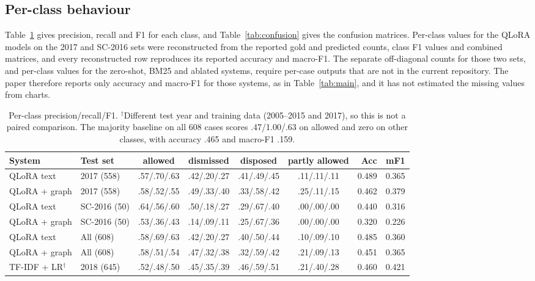 \documentclass[journal]{IEEEtran}
\begin{document}
\subsection{Per-class behaviour}
Table~\ref{tab:perclass} gives precision, recall and F1 for each class, and Table~\ref{tab:confusion} gives the confusion matrices. Per-class values for the QLoRA models on the 2017 and SC-2016 sets were reconstructed from the reported gold and predicted counts, class F1 values and combined matrices, and every reconstructed row reproduces its reported accuracy and macro-F1. The separate off-diagonal counts for those two sets, and per-class values for the zero-shot, BM25 and ablated systems, require per-case outputs that are not in the current repository. The paper therefore reports only accuracy and macro-F1 for those systems, as in Table~\ref{tab:main}, and it has not estimated the missing values from charts.

\begin{table}[!t]\centering\footnotesize
\setlength{\tabcolsep}{3.5pt}
\caption{Per-class precision/recall/F1. $^\dagger$Different test year and training data (2005--2015 and 2017), so this is not a paired comparison. The majority baseline on all 608 cases scores .47/1.00/.63 on allowed and zero on other classes, with accuracy .465 and macro-F1 .159.}\label{tab:perclass}
\begin{tabular}{@{}llccccrr@{}}\toprule
System & Test set & allowed & dismissed & disposed & partly allowed & Acc & mF1\\\midrule
QLoRA text & 2017 (558) & .57/.70/.63 & .42/.20/.27 & .41/.49/.45 & .11/.11/.11 & 0.489 & 0.365 \\
QLoRA + graph & 2017 (558) & .58/.52/.55 & .49/.33/.40 & .33/.58/.42 & .25/.11/.15 & 0.462 & 0.379 \\
QLoRA text & SC-2016 (50) & .64/.56/.60 & .50/.18/.27 & .29/.67/.40 & .00/.00/.00 & 0.440 & 0.316 \\
QLoRA + graph & SC-2016 (50) & .53/.36/.43 & .14/.09/.11 & .25/.67/.36 & .00/.00/.00 & 0.320 & 0.226 \\
QLoRA text & All (608) & .58/.69/.63 & .42/.20/.27 & .40/.50/.44 & .10/.09/.10 & 0.485 & 0.360 \\
QLoRA + graph & All (608) & .58/.51/.54 & .47/.32/.38 & .32/.59/.42 & .21/.09/.13 & 0.451 & 0.365 \\
TF-IDF + LR$^\dagger$ & 2018 (645) & .52/.48/.50 & .45/.35/.39 & .46/.59/.51 & .21/.40/.28 & 0.460 & 0.421 \\
\bottomrule\end{tabular}\end{table}
\end{document}
